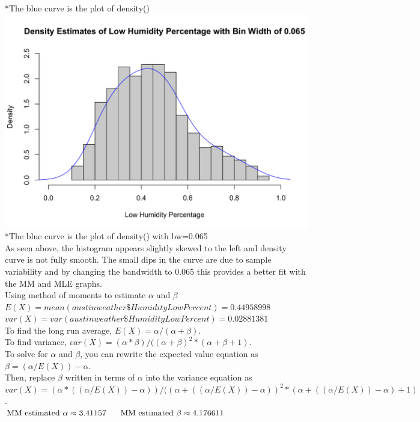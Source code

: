 \documentclass[12pt, letterpaper]{article}
\newcommand{\tab}{\hspace*{4ex}}
\begin{document}
\footnotesize
\\ \**The blue curve is the plot of density() \\
\includegraphics[scale=0.35]{austinweather_densitybw0.065.png}
\\ \**The blue curve is the plot of density() with bw=0.065 \\
\normalsize
As seen above, the histogram appears slightly skewed to the left and density curve is not fully smooth. The small dips in the curve are due to sample variability and by changing the bandwidth to 0.065 this provides a better fit with the MM and MLE graphs.
\\[0.5\baselineskip]
Using method of moments to estimate ${\alpha}$ and ${\beta}$\\
$E(X) = mean(austinweather\$HumidityLowPercent) = 0.44958998$\\
$var(X) = var(austinweather\$HumidityLowPercent) = 0.02881381$\\
To find the long run average, $E(X) = {\alpha / (\alpha + \beta)}$.\\ 
To find variance, $var(X) = {(\alpha*\beta)/ ((\alpha + \beta)^2*(\alpha + \beta + 1)}$.\\
To solve for $\alpha$ and $\beta$, you can rewrite the expected value equation as $\beta = (\alpha/E(X)) - \alpha$. \\
Then, replace $\beta$ written in terms of $\alpha$ into the variance equation as \\ $var(X) = {(\alpha*((\alpha/E(X)) - \alpha))/ ((\alpha + ((\alpha/E(X)) - \alpha))^2*(\alpha + ((\alpha/E(X)) - \alpha) + 1)}$.\\ $\text{MM estimated } \alpha \approx 3.41157 \tab \text{MM estimated } \beta \approx 4.176611$\\
\end{document}
